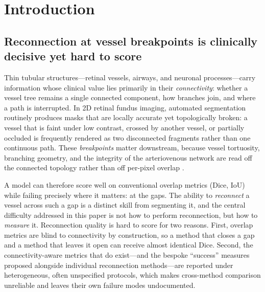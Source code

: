 \section{Introduction}
\label{sec:intro}

\subsection{Reconnection at vessel breakpoints is clinically decisive yet hard to score}
\label{sec:intro:problem}

Thin tubular structures---retinal vessels, airways, and neuronal
processes---carry information whose clinical value lies primarily in their
\emph{connectivity}: whether a vessel tree remains a single connected
component, how branches join, and where a path is interrupted. In 2D retinal
fundus imaging, automated segmentation routinely produces masks that are
locally accurate yet topologically broken: a vessel that is faint under low
contrast, crossed by another vessel, or partially occluded is frequently
rendered as two disconnected fragments rather than one continuous path.
These \emph{breakpoints} matter downstream, because vessel tortuosity,
branching geometry, and the integrity of the arteriovenous network are read
off the connected topology rather than off per-pixel overlap
\cite{TODO_clinical_connectivity}.

A model can therefore score well on conventional overlap metrics
(Dice, IoU) while failing precisely where it matters: at the gaps. The
ability to \emph{reconnect} a vessel across such a gap is a distinct skill
from segmenting it, and the central difficulty addressed in this paper is
not how to perform reconnection, but how to \emph{measure} it. Reconnection
quality is hard to score for two reasons. First, overlap metrics are blind
to connectivity by construction, so a method that closes a gap and a method
that leaves it open can receive almost identical Dice. Second, the
connectivity-aware metrics that do exist---and the bespoke ``success''
measures proposed alongside individual reconnection methods---are reported
under heterogeneous, often unspecified protocols, which makes cross-method
comparison unreliable and leaves their own failure modes undocumented.

